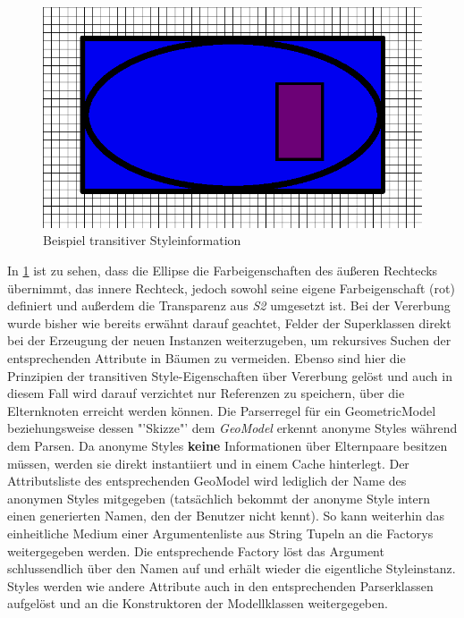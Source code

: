 \begin{figure}[H]
\begin{center}
\includegraphics[scale = 0.5]{Bilder/transitiveStyle.png}
\caption{Beispiel transitiver Styleinformation}
\label{transitiveStyleExample}
\end{center}
\end{figure}In \ref{transitiveStyleExample} ist zu sehen, dass die Ellipse die Farbeigenschaften des äußeren Rechtecks übernimmt, das innere Rechteck, jedoch sowohl seine eigene Farbeigenschaft (rot) definiert und außerdem die Transparenz aus \textit{S2} umgesetzt ist.
Bei der Vererbung wurde bisher wie bereits erwähnt darauf geachtet, Felder der Superklassen direkt bei der Erzeugung der neuen Instanzen weiterzugeben, um rekursives Suchen der entsprechenden Attribute in Bäumen zu vermeiden. Ebenso sind hier die Prinzipien der transitiven Style-Eigenschaften über Vererbung gelöst und auch in diesem Fall wird darauf verzichtet nur Referenzen zu speichern, über die Elternknoten erreicht werden können.
Die Parserregel für ein GeometricModel beziehungsweise dessen "'Skizze"' dem \textit{GeoModel} erkennt anonyme Styles während dem Parsen. Da anonyme Styles \textbf{keine} Informationen über Elternpaare besitzen müssen, werden sie direkt instantiiert und in einem Cache hinterlegt. Der Attributsliste des entsprechenden GeoModel wird lediglich der Name des anonymen Styles mitgegeben (tatsächlich bekommt der anonyme Style intern einen generierten Namen, den der Benutzer nicht kennt). So kann weiterhin das einheitliche Medium einer Argumentenliste aus String Tupeln an die Factorys weitergegeben werden. Die entsprechende Factory löst das Argument schlussendlich über den Namen auf und erhält wieder die eigentliche Styleinstanz.
Styles werden wie andere Attribute auch in den entsprechenden Parserklassen aufgelöst und an die Konstruktoren der Modellklassen weitergegeben.

